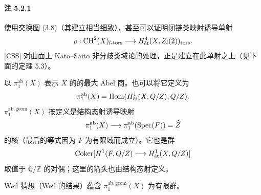 \paragraph{注 5.2.1}
使用交换图 (3.8)（其建立相当细致），甚至可以证明闭链类映射诱导单射
\[
\rho:\operatorname{CH}^2(X)_{l\text{-}\mathrm{tors}}\longrightarrow H^4_{\mathrm{\acute et}}(X,Z_l(2))_{\mathrm{tors}}.
\]
[CSS] 对曲面上 Kato--Saito 非分歧类域论的处理，正是建立在此单射之上（见下面的定理 5.3）。

以 $\pi_1^{\mathrm{ab}}(X)$ 表示 $X$ 的的最大 Abel 商。也可以将它定义为
\[
\pi_1^{\mathrm{ab}}(X)=\operatorname{Hom}(H^1_{\mathrm{\acute et}}(X,Q/Z),Q/Z).
\]
 $\pi_1^{\mathrm{ab,geom}}(X)$ 按定义是结构态射诱导映射
\[
\pi_1^{\mathrm{ab}}(X)\longrightarrow\pi_1^{\mathrm{ab}}(\operatorname{Spec}(F))=\widehat{Z}
\]
的核（最后的等式因为 $F$ 为有限域而成立）。它也是群
\[
\operatorname{Coker}[H^1(F,Q/Z)\longrightarrow H^1_{\mathrm{\acute et}}(X,Q/Z)]
\]
取值于 $\mathbb Q/\mathbb Z$ 的对偶；这里的箭头也由结构态射定义。

Weil 猜想（Weil 的结果）蕴含 $\pi_1^{\mathrm{ab,geom}}(X)$ 为有限群。

